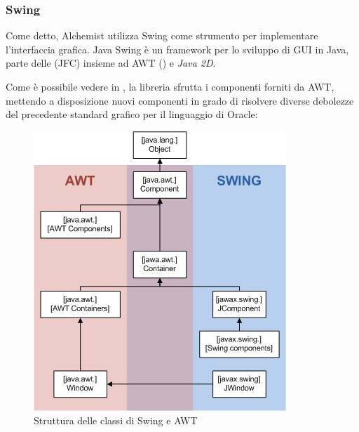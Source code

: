             \subsubsection{Swing}\label{subsub:swing}
                Come detto, Alchemist utilizza Swing come strumento per implementare l'interfaccia grafica. Java Swing è un framework per lo sviluppo di GUI in Java, parte delle  (JFC) insieme ad AWT () e \emph{Java 2D}.

                Come è possibile vedere in , la libreria sfrutta i componenti forniti da AWT, mettendo a disposizione nuovi componenti in grado di risolvere diverse debolezze del precedente standard grafico per il linguaggio di Oracle:

                \begin{figure}[htbp]
                    \centering
                    \includegraphics[scale=.45]{img/AWTSwing}
                    \caption{Struttura delle classi di Swing e AWT}
                    \label{fig:awt}
                \end{figure}

